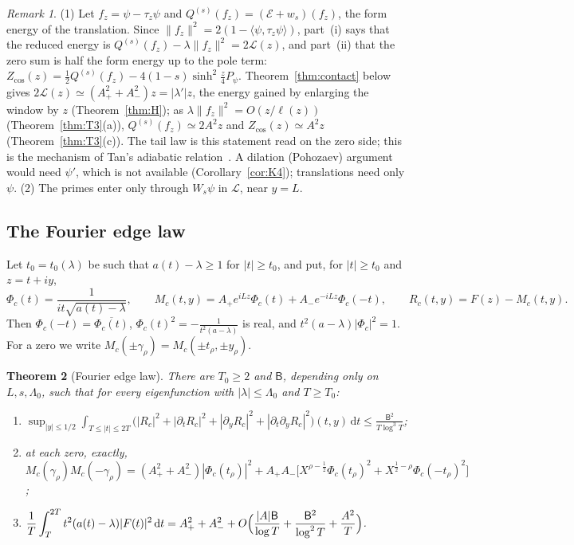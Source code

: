 \documentclass[11pt]{amsart}
\newcommand{\cE}{\mathcal{E}}
\newcommand{\cL}{\mathcal{L}}
\newcommand{\dd}{\,\mathrm{d}}
\newtheorem{theorem}{Theorem}[section]
\theoremstyle{definition}
\theoremstyle{remark}
\newtheorem{remark}[theorem]{Remark}
\numberwithin{equation}{section}
\begin{document}
\begin{remark}\label{rem:T0}
(1) Let $f_z=\psi-\tau_z\psi$ and $Q^{(s)}(f_z)=(\cE+w_s)(f_z)$, the form energy of the translation. Since $\|f_z\|^2=2(1-\langle\psi,\tau_z\psi\rangle)$, part~(i) says that the reduced energy is $Q^{(s)}(f_z)-\lambda\|f_z\|^2=2\cL(z)$, and part~(ii) that the zero sum is half the form energy up to the pole term: $Z_{\cos}(z)=\frac12Q^{(s)}(f_z)-4(1-s)\sinh^2\frac z4P_\psi$. Theorem~\ref{thm:contact} below gives $2\cL(z)\simeq(A_+^2+A_-^2)z=|\lambda'|z$, the energy gained by enlarging the window by $z$ (Theorem~\ref{thm:H}); as $\lambda\|f_z\|^2=O(z/\ell(z))$ (Theorem~\ref{thm:T3}(a)), $Q^{(s)}(f_z)\simeq2A^2z$ and $Z_{\cos}(z)\simeq A^2z$ (Theorem~\ref{thm:T3}(c)). The tail law is this statement read on the zero side; this is the mechanism of Tan's adiabatic relation~\cite{Tan08a,BP08}. A dilation (Pohozaev) argument would need $\psi'$, which is not available (Corollary~\ref{cor:K4}); translations need only $\psi$. (2) The primes enter only through $W_s\psi$ in $\cL$, near $y=L$.
\end{remark}

\subsection{The Fourier edge law}\label{sec:Fedge}
Let $t_0=t_0(\lambda)$ be such that $a(t)-\lambda\ge1$ for $|t|\ge t_0$, and put, for $|t|\ge t_0$ and $z=t+iy$,
\[
\Phi_c(t)=\frac1{it\sqrt{a(t)-\lambda}},\qquad M_c(t,y)=A_+e^{iLz}\Phi_c(t)+A_-e^{-iLz}\Phi_c(-t),\qquad R_c(t,y)=F(z)-M_c(t,y).
\]
Then $\Phi_c(-t)=\overline{\Phi_c(t)}$, $\Phi_c(t)^2=-\frac1{t^2(a-\lambda)}$ is real, and $t^2(a-\lambda)|\Phi_c|^2=1$. For a zero we write $M_c(\pm\gamma_\rho)=M_c(\pm t_\rho,\pm y_\rho)$.

\begin{theorem}[Fourier edge law]\label{thm:T1}
There are $T_0\ge2$ and $\mathsf B$, depending only on $L,s,\Lambda_0$, such that for every eigenfunction with $|\lambda|\le\Lambda_0$ and $T\ge T_0$:
\begin{enumerate}
\item[(a)] $\displaystyle\sup_{|y|\le1/2}\int_{T\le|t|\le2T}\bigl(|R_c|^2+|\partial_tR_c|^2+|\partial_yR_c|^2+|\partial_t\partial_yR_c|^2\bigr)(t,y)\dd t\le\frac{\mathsf B^2}{T\log^3T}$;
\item[(b)] at each zero, exactly, $M_c(\gamma_\rho)M_c(-\gamma_\rho)=(A_+^2+A_-^2)|\Phi_c(t_\rho)|^2+A_+A_-\bigl[X^{\rho-\frac12}\Phi_c(t_\rho)^2+X^{\frac12-\rho}\Phi_c(-t_\rho)^2\bigr]$;
\item[(c)] $\displaystyle\frac1T\int_T^{2T}t^2(a(t)-\lambda)|F(t)|^2\dd t=A_+^2+A_-^2+O\Bigl(\frac{|A|\mathsf B}{\log T}+\frac{\mathsf B^2}{\log^2T}+\frac{A^2}T\Bigr)$.
\end{enumerate}
\end{theorem}
\end{document}
